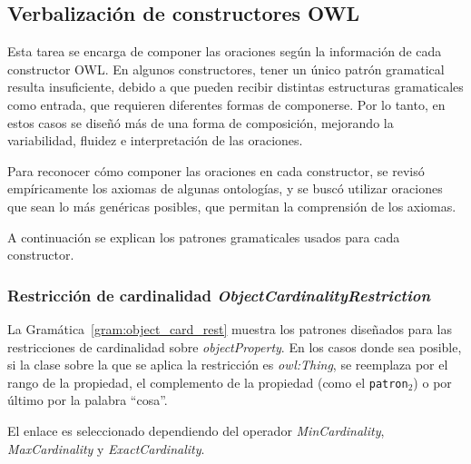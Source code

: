 \subsection{Verbalización de constructores OWL}
\label{sec:verbalizacion_constructores}
Esta tarea se encarga de componer las oraciones según la información de cada constructor OWL.
En algunos constructores, tener un único patrón gramatical resulta insuficiente, debido a que pueden recibir distintas estructuras gramaticales como entrada, que requieren diferentes formas de componerse. Por lo tanto, en estos casos se diseñó más de una forma de composición, mejorando la variabilidad, fluidez e interpretación de las oraciones. 

Para reconocer cómo componer las oraciones en cada constructor, se revisó empíricamente los axiomas de algunas ontologías, y se buscó utilizar oraciones que sean lo más genéricas posibles, que permitan la comprensión de los axiomas. 

A continuación se explican los patrones gramaticales usados para cada constructor. %

\subsubsection{Restricción de cardinalidad \emph{ObjectCardinalityRestriction}}

La Gramática~\ref{gram:object_card_rest} muestra los patrones diseñados para las restricciones de cardinalidad sobre \emph{objectProperty}. En los casos donde sea posible, si la clase sobre la que se aplica la restricción es \emph{owl:Thing}, se reemplaza por el rango de la propiedad, el complemento de la propiedad (como el {\tt patron$_2$}) o por último por la palabra ``cosa''.

El enlace es seleccionado dependiendo del operador \emph{MinCardinality}, \emph{MaxCardinality} y \emph{ExactCardinality}.


